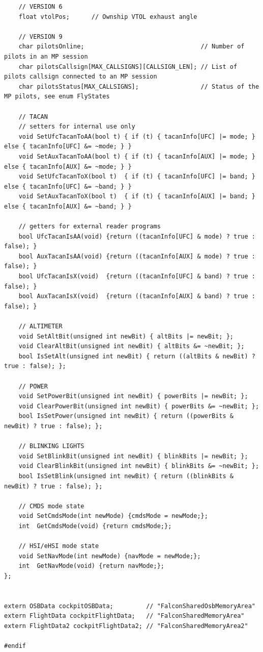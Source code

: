 \documentclass[11pt,letterpaper,titlepage]{article}
\begin{document}
\begin{landscape}
\begin{lstlisting}
	// VERSION 6
	float vtolPos;      // Ownship VTOL exhaust angle

	// VERSION 9
	char pilotsOnline;                                // Number of pilots in an MP session
	char pilotsCallsign[MAX_CALLSIGNS][CALLSIGN_LEN]; // List of pilots callsign connected to an MP session
	char pilotsStatus[MAX_CALLSIGNS];                 // Status of the MP pilots, see enum FlyStates

	// TACAN
	// setters for internal use only
	void SetUfcTacanToAA(bool t) { if (t) { tacanInfo[UFC] |= mode; } else { tacanInfo[UFC] &= ~mode; } }
	void SetAuxTacanToAA(bool t) { if (t) { tacanInfo[AUX] |= mode; } else { tacanInfo[AUX] &= ~mode; } }
	void SetUfcTacanToX(bool t)  { if (t) { tacanInfo[UFC] |= band; } else { tacanInfo[UFC] &= ~band; } }
	void SetAuxTacanToX(bool t)  { if (t) { tacanInfo[AUX] |= band; } else { tacanInfo[AUX] &= ~band; } }

	// getters for external reader programs
	bool UfcTacanIsAA(void) {return ((tacanInfo[UFC] & mode) ? true : false); }
	bool AuxTacanIsAA(void) {return ((tacanInfo[AUX] & mode) ? true : false); }
	bool UfcTacanIsX(void)  {return ((tacanInfo[UFC] & band) ? true : false); }
	bool AuxTacanIsX(void)  {return ((tacanInfo[AUX] & band) ? true : false); }

	// ALTIMETER
	void SetAltBit(unsigned int newBit) { altBits |= newBit; };
	void ClearAltBit(unsigned int newBit) { altBits &= ~newBit; };
	bool IsSetAlt(unsigned int newBit) { return ((altBits & newBit) ? true : false); };

	// POWER
	void SetPowerBit(unsigned int newBit) { powerBits |= newBit; };
	void ClearPowerBit(unsigned int newBit) { powerBits &= ~newBit; };
	bool IsSetPower(unsigned int newBit) { return ((powerBits & newBit) ? true : false); };

    // BLINKING LIGHTS
	void SetBlinkBit(unsigned int newBit) { blinkBits |= newBit; };
	void ClearBlinkBit(unsigned int newBit) { blinkBits &= ~newBit; };
	bool IsSetBlink(unsigned int newBit) { return ((blinkBits & newBit) ? true : false); };

	// CMDS mode state
	void SetCmdsMode(int newMode) {cmdsMode = newMode;};
	int  GetCmdsMode(void) {return cmdsMode;};

	// HSI/eHSI mode state
	void SetNavMode(int newMode) {navMode = newMode;};
	int  GetNavMode(void) {return navMode;};
};


extern OSBData cockpitOSBData;         // "FalconSharedOsbMemoryArea"
extern FlightData cockpitFlightData;   // "FalconSharedMemoryArea"
extern FlightData2 cockpitFlightData2; // "FalconSharedMemoryArea2"

#endif

\end{lstlisting}


\end{landscape}
\end{document}
